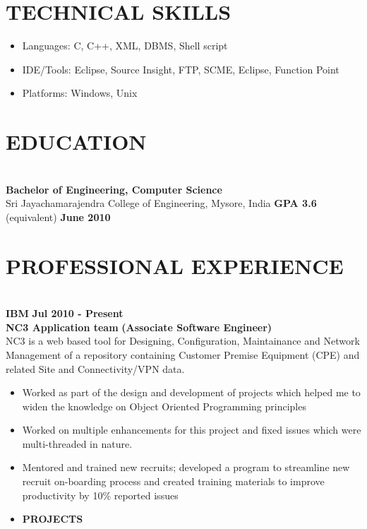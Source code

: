 \documentclass{system}
\begin{document}
\begin{resume}
\section {TECHNICAL SKILLS}
\hrulefill
   \begin{itemize} \itemsep -2pt %
   \item Languages: C, C++, XML, DBMS, Shell script
   \item IDE/Tools: Eclipse, Source Insight, FTP, SCME, Eclipse, Function Point
   \item Platforms: Windows, Unix
 \end{itemize}
\vspace{5pt}
 
\section{EDUCATION} 
\hrulefill\\
{\bfseries Bachelor of Engineering, Computer Science} \\ %
Sri Jayachamarajendra College of Engineering, Mysore, India
\hspace{0.2in}  {\bfseries GPA 3.6} (equivalent)
\hfill    {\bfseries June 2010}
  
\vspace{5pt}
\section{{PROFESSIONAL EXPERIENCE}} 
\hrulefill \\
{\bfseries IBM} \hfill         {\bfseries Jul 2010 - Present} \\
{\bfseries NC3 Application team}       \hfill   {\bfseries (Associate Software
Engineer)}\\
 NC3 is a web based tool for Designing, Configuration, Maintainance and Network
 Management of a repository containing Customer Premise Equipment (CPE) and
 related Site and Connectivity/VPN data. 
   \begin{itemize} \itemsep 2pt %
   \item Worked as part of the design and development of projects which helped
   me to widen the knowledge on Object Oriented Programming principles
   \item Worked on multiple enhancements for this project and fixed issues
   which were multi-threaded in nature.
   \item  Mentored and trained new recruits; developed a program to streamline new
 recruit on-boarding process and created training materials to improve 
 productivity by 10\%
   reported issues
   \item {\bfseries PROJECTS}
    \begin{itemize} \itemsep 2pt


\end{itemize}
\end{itemize}
\end{resume}
\end{document}
